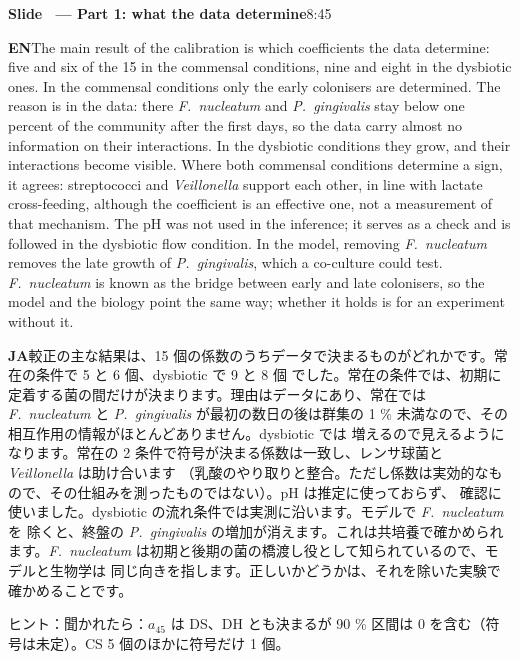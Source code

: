 \documentclass[11pt,a4paper]{article}
\newcounter{sl}
\newcommand{\slide}[2]{\stepcounter{sl}\vspace{8pt}%
  {\color{c3}\large\bfseries Slide \thesl\ --- #1}\hfill{\small #2}\par\vspace{2pt}}
\newcommand{\EN}{\textbf{EN}\quad}
\newcommand{\JA}{\par\textbf{JA}\quad}
\newcommand{\hint}[1]{\par{\color{gray}\small ヒント：#1}}
\begin{document}
\slide{Part 1: what the data determine}{8:45}
\EN The main result of the calibration is which coefficients the data
determine: five and six of the 15 in the commensal conditions, nine and eight in the dysbiotic ones.
In the commensal conditions only the early colonisers are determined. The reason is in the data: there
\textit{F.~nucleatum} and \textit{P.~gingivalis} stay below one percent of the community after the first days,
so the data carry almost no information on their interactions. In the dysbiotic conditions they grow, and their
interactions become visible. Where both commensal conditions determine a sign, it agrees: streptococci and
\textit{Veillonella} support each other, in line with lactate cross-feeding, although the coefficient is an
effective one, not a measurement of that mechanism. The pH was not used in
the inference; it serves as a check and is followed in the dysbiotic flow
condition. In the model, removing \textit{F.~nucleatum} removes the late growth
of \textit{P.~gingivalis}, which a co-culture could test. \textit{F.~nucleatum} is known as the bridge between
early and late colonisers, so the model and the biology point the same way; whether it holds is for an experiment
without it.
\JA 較正の主な結果は、15 個の係数のうちデータで決まるものがどれかです。常在の条件で 5 と 6 個、dysbiotic で 9 と 8 個
でした。常在の条件では、初期に定着する菌の間だけが決まります。理由はデータにあり、常在では \textit{F.~nucleatum} と
\textit{P.~gingivalis} が最初の数日の後は群集の 1 \% 未満なので、その相互作用の情報がほとんどありません。dysbiotic では
増えるので見えるようになります。常在の 2 条件で符号が決まる係数は一致し、レンサ球菌と \textit{Veillonella} は助け合います
（乳酸のやり取りと整合。ただし係数は実効的なもので、その仕組みを測ったものではない）。pH は推定に使っておらず、
確認に使いました。dysbiotic の流れ条件では実測に沿います。モデルで \textit{F.~nucleatum} を
除くと、終盤の \textit{P.~gingivalis} の増加が消えます。これは共培養で確かめられます。\textit{F.~nucleatum} は初期と後期の菌の橋渡し役として知られているので、モデルと生物学は
同じ向きを指します。正しいかどうかは、それを除いた実験で確かめることです。
\hint{聞かれたら：$a_{45}$ は DS、DH とも決まるが 90 \% 区間は 0 を含む（符号は未定）。CS 5 個のほかに符号だけ 1 個。}
\end{document}
